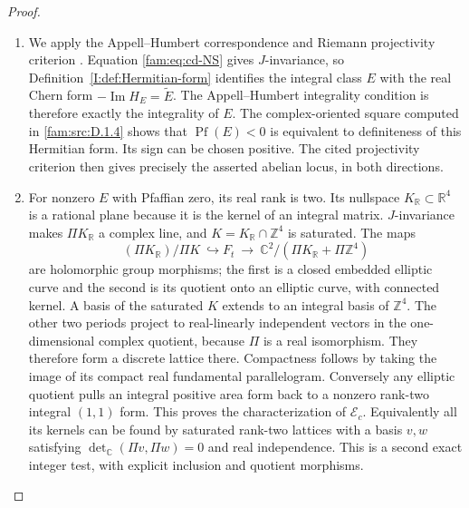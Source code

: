 \begin{proof}
\begin{enumerate}[label=\arabic*.,leftmargin=*]
\item \hypertarget{tag-000G}{}\label{app:rederive:fam-src-D.1.6}
We apply the Appell--Humbert correspondence and Riemann projectivity
criterion \cite[Theorem~4.1, p.~1, and Theorem~4.4, p.~3]{Schnell19}.
Equation \eqref{fam:eq:cd-NS} gives $J$-invariance, so
Definition~\ref{I:def:Hermitian-form} identifies the integral class $E$
with the real Chern form $-\operatorname{Im}H_E=\widetilde E$.
The Appell--Humbert integrality condition is therefore exactly the
integrality of $E$. The complex-oriented square computed in \ref{fam:src:D.1.4} shows that
$\operatorname{Pf}(E)<0$ is equivalent to definiteness of this Hermitian
form. Its sign can be chosen positive. The cited projectivity criterion
then gives precisely the asserted abelian locus, in both directions.

\item For nonzero $E$ with Pfaffian zero, its real rank is two. Its nullspace
$K_{\mathbb R}\subset\mathbb R^4$ is a rational plane because it is the
kernel of an integral matrix. $J$-invariance makes $\Pi K_{\mathbb R}$ a
complex line, and $K=K_{\mathbb R}\cap\mathbb Z^4$ is saturated. The maps
\[
 (\Pi K_{\mathbb R})/\Pi K\ \hookrightarrow F_t
 \ \longrightarrow\
 \mathbb C^2/(\Pi K_{\mathbb R}+\Pi\mathbb Z^4)
\]
are holomorphic group morphisms; the first is a closed embedded elliptic
curve and the second is its quotient onto an elliptic curve, with
connected kernel. A basis of the saturated $K$ extends to an integral basis of $\mathbb Z^4$.
The other two periods project to real-linearly independent vectors in the
one-dimensional complex quotient, because $\Pi$ is a real isomorphism.
They therefore form a discrete lattice there. Compactness follows by
taking the image of its compact real fundamental parallelogram. Conversely any elliptic quotient
pulls an integral positive area form back to a nonzero rank-two integral
$(1,1)$ form. This proves the characterization of $\mathcal E_c$.
Equivalently all its kernels can be found by saturated rank-two lattices
with a basis $v,w$ satisfying
$\det_{\mathbb C}(\Pi v,\Pi w)=0$ and real independence. This is a second
exact integer test, with explicit inclusion and quotient morphisms.


\end{enumerate}
\end{proof}
